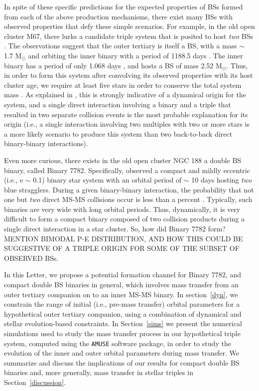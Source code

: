 \documentclass{aastex62}
\begin{document}
In spite of these specific predictions for the expected properties of BSs formed from each of the above production mechanisms, there exist many BSs with observed properties that defy these simple scenarios.  For example, in the old open cluster M67, there lurks a candidate triple system that is posited to host \textit{two} BSs \citep{vandenberg01,sandquist03}.  The observations suggest that the outer tertiary is itself a BS, with a mass $\sim$ 1.7 M$_{\odot}$ and orbiting the inner binary with a period of 1188.5 days \citep{sandquist03}.  The inner binary has a period of only 1.068 days \citep{vandenberg01}, and hosts a BS of mass 2.52 M$_{\odot}$.  Thus, in order to form this system after convolving its observed properties with its host cluster age, we require at least five stars in order to conserve the total system mass \citep{leigh11}.  As explained in \citet{leigh11}, this is strongly indicative of a dynamical origin for the system, and a single direct interaction involving a binary and a triple that resulted in two separate collision events is the most probable explanation for its origin (i.e., a single interaction involving two multiples with two or more stars is a more likely scenario to produce this system than two back-to-back direct binary-binary interactions).  

Even more curious, there exists in the old open cluster NGC 188 a double BS binary, called Binary 7782.  Specifically, \citet{mathieu09} observed a compact and mildly eccentric (i.e., e $\sim$ 0.1) binary star system with an orbital period of $\sim$ 10 days hosting \textit{two} blue stragglers.  During a given binary-binary interaction, the probability that not one but \textit{two} direct MS-MS collisions occur is less than a percent \citep{leonard89,leigh11,leigh12}.  Typically, such binaries are very wide with long orbital periods.  Thus, dynamically, it is very difficult to form a compact binary composed of two collision products during a single direct interaction in a star cluster.  So, how did Binary 7782 form?  MENTION BIMODAL P-E DISTRIBUTION, AND HOW THIS COULD BE SUGGESTIVE OF A TRIPLE ORIGIN FOR SOME OF THE SUBSET OF OBSERVED BSs.

In this Letter, we propose a potential formation channel for Binary 7782, and compact double BS binaries in general, which involves mass transfer from an outer tertiary companion on to an inner MS-MS binary.  In section~\ref{dyn}, we constrain the range of initial (i.e., pre-mass transfer) orbital parameters for a hypothetical outer tertiary companion, using a combination of dynamical and stellar evolution-based constraints.  In Section~\ref{sims} we present the numerical simulations used to study the mass transfer process in our hypothetical triple system, computed using the \texttt{AMUSE} software package, in order to study the evolution of the inner and outer orbital parameters during mass transfer.  We summarize and discuss the implications of our results for compact double BS binaries and, more generally, mass transfer in stellar triples in Section~\ref{discussion}.  
\end{document}
